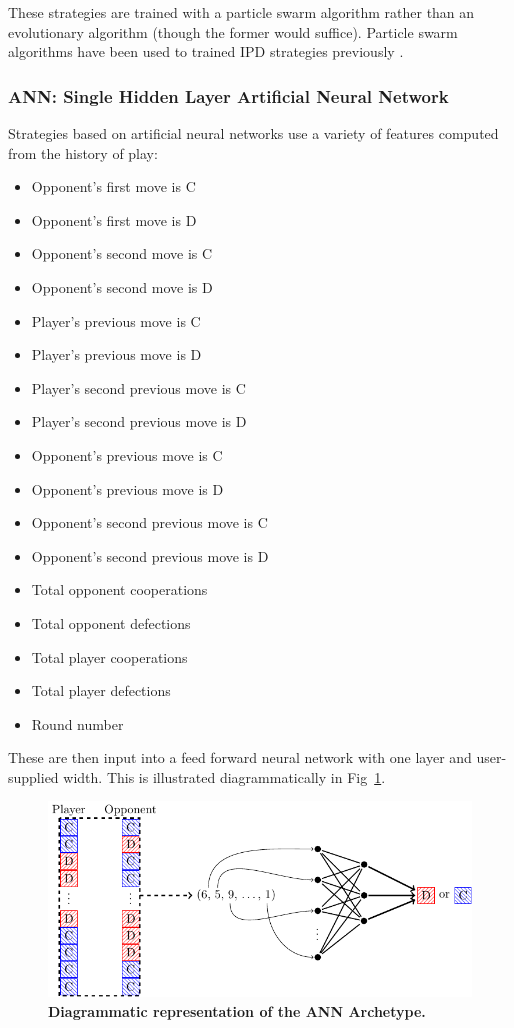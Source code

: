 \documentclass[10pt,letterpaper]{article}
\begin{document}
These strategies are trained with a particle swarm algorithm rather than an
evolutionary algorithm (though the former would suffice). Particle swarm
algorithms have been used to trained IPD strategies previously
\cite{franken2005particle}.

\subsubsection*{ANN: Single Hidden Layer Artificial Neural Network}\label{sec:ann}

Strategies based on artificial neural networks use a variety of features
computed from the history of play:

\begin{itemize}
    \item Opponent's first move is C
    \item Opponent's first move is D
    \item Opponent's second move is C
    \item Opponent's second move is D
    \item Player's previous move is C
    \item Player's previous move is D
    \item Player's second previous move is C
    \item Player's second previous move is D
    \item Opponent's previous move is C
    \item Opponent's previous move is D
    \item Opponent's second previous move is C
    \item Opponent's second previous move is D
    \item Total opponent cooperations
    \item Total opponent defections
    \item Total player cooperations
    \item Total player defections
    \item Round number
\end{itemize}

These are then input into a feed forward neural network with one layer and
user-supplied width. This is illustrated diagrammatically in
Fig~\ref{fig:ann}.

\begin{figure}[!hbtp]
    \centering
    \includegraphics[width=.9\textwidth]{ann.pdf}
    \caption{\bf Diagrammatic representation of the ANN Archetype.}
    \label{fig:ann}
\end{figure}
\end{document}

